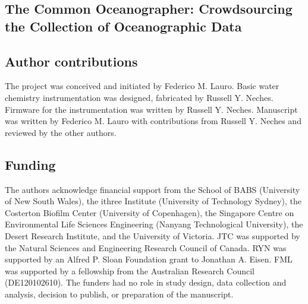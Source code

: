 \begin{refsection}

\chapter{The Common Oceanographer: Crowdsourcing the Collection of Oceanographic Data}


\section{Author contributions}

The project was conceived and initiated by Federico M. Lauro. Basic
water chemistry instrumentation was designed, fabricated by Russell Y.
Neches. Firmware for the instrumentation was written by Russell Y.
Neches. Manuscript was written by Federico M. Lauro with contributions
from Russell Y. Neches and reviewed by the other authors.










\section{Funding}

The authors acknowledge financial support from the School of BABS (University of New South Wales), the ithree Institute (University of Technology Sydney), the Costerton Biofilm Center (University of Copenhagen), the Singapore Centre on Environmental Life Sciences Engineering (Nanyang Technological University), the Desert Research Institute, and the University of Victoria. JTC was supported by the Natural Sciences and Engineering Research Council of Canada. RYN was supported by an Alfred P. Sloan Foundation grant to Jonathan A. Eisen. FML was supported by a fellowship from the Australian Research Council (DE120102610). The funders had no role in study design, data collection and analysis, decision to publish, or preparation of the manuscript.


\end{refsection}
